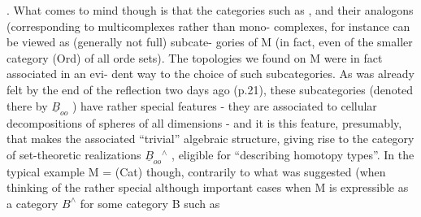 .  What comes to mind though is that the categories such as \hand{$\Delta$} , \hand{$\square$}
and their analogons (corresponding to multicomplexes rather than mono-%
complexes, for instance\over{\unsure{,}}{)}  can be viewed as (generally not full) subcate-%
gories of M  (in fact,  even of the smaller category (Ord) of all orde
sets).  The topologies we found on M were in fact associated in an evi-%
dent way to the choice of such subcategories.  As was already felt by
the end of the reflection two days ago (p.21),  these subcategories
(denoted there by $\underline{B}_{oo}$  ) have rather special features  -  they are
associated to  cellular decompositions of spheres of all dimensions  -
and it is this feature,  presumably,  that makes the associated ``trivial''
algebraic structure, giving rise to the category of set-theoretic
realizations  $\underline{B}_{oo}{}^{\wedge}$ ,  eligible for ``describing homotopy types''.  In the
typical example M = (Cat) though,  contrarily to what was suggested 
  (when thinking  of the rather special although important cases
when M is expressible  as a category  $B^{\wedge}$\hand{,} for some category B such as
